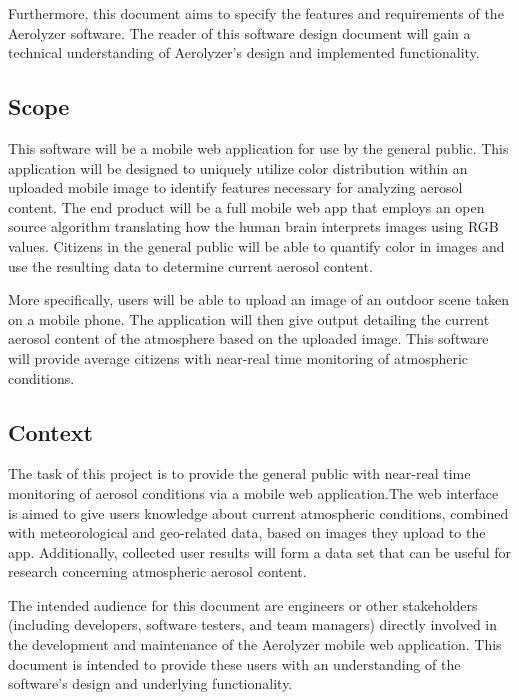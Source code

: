 \documentclass[onecolumn, draftclsnofoot,10pt, compsoc]{IEEEtran}
\begin{document}
\begin{flushleft}
\medskip

Furthermore, this document aims to specify the features and requirements of the Aerolyzer software. The reader of this software design document will gain a technical understanding of Aerolyzer's design and implemented functionality. 


\subsection{Scope }
This software will be a mobile web application for use by the general public. 
This application will be designed to uniquely utilize color distribution within an uploaded mobile image to identify features necessary for analyzing aerosol content. 
The end product will be a full mobile web app that employs an open source algorithm translating how the human brain interprets images using RGB values. 
Citizens in the general public will be able to quantify color in images and use the resulting data to determine current aerosol content. 

\medskip %

More specifically, users will be able to upload an image of an outdoor scene taken on a mobile phone. 
The application will then give output detailing the current aerosol content of the atmosphere based on the uploaded image. 
This software will provide average citizens with near-real time monitoring of atmospheric conditions.

\subsection{Context}
The task of this project is to provide the general public with near-real time monitoring of aerosol conditions via a mobile web application.The web interface is aimed to give users knowledge about current atmospheric conditions, combined with meteorological and geo-related data, based on images they upload to the app. Additionally, collected user results will form a data set that can be useful for research concerning atmospheric aerosol content. 

\medskip

The intended audience for this document are engineers or other stakeholders (including developers, software testers, and team managers) directly involved in the development and maintenance of the Aerolyzer mobile web application. This document is intended to provide these users with an understanding of the software’s design and underlying functionality.


\end{flushleft}
\end{document}
